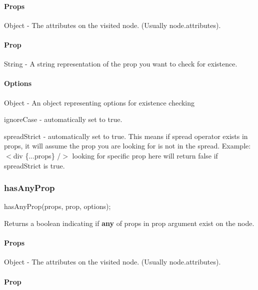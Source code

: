 \paragraph*{Props}

Object -\/ The attributes on the visited node. (Usually {\ttfamily node.\+attributes}). \paragraph*{Prop}

String -\/ A string representation of the prop you want to check for existence. \paragraph*{Options}

Object -\/ An object representing options for existence checking
\begin{DoxyEnumerate}
\item {\ttfamily ignore\+Case} -\/ automatically set to {\ttfamily true}.
\item {\ttfamily spread\+Strict} -\/ automatically set to {\ttfamily true}. This means if spread operator exists in props, it will assume the prop you are looking for is not in the spread. Example\+: {\ttfamily $<$div \{...props\} /$>$} looking for specific prop here will return false if {\ttfamily spread\+Strict} is {\ttfamily true}.
\end{DoxyEnumerate}





\subsubsection*{has\+Any\+Prop}


\begin{DoxyCode}
hasAnyProp(props, prop, options);
\end{DoxyCode}
 Returns a boolean indicating if {\bfseries any} of props in {\ttfamily prop} argument exist on the node.

\paragraph*{Props}

Object -\/ The attributes on the visited node. (Usually {\ttfamily node.\+attributes}). \paragraph*{Prop}

